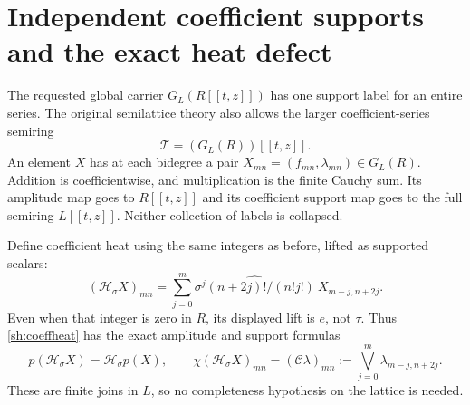 \documentclass[11pt]{article}
\newcommand{\Ht}{\mathcal H}
\begin{document}
\section{Independent coefficient supports and the exact heat defect}

The requested global carrier $G_L(R[[t,z]])$ has one support
label for an entire series. The original semilattice theory also
allows the larger coefficient-series semiring
\[
 \mathscr T=(G_L(R))[[t,z]].
\]
An element $X$ has at each bidegree a pair
$X_{mn}=(f_{mn},\lambda_{mn})\in G_L(R)$.
Addition is coefficientwise, and multiplication is the finite
Cauchy sum. Its amplitude map goes to $R[[t,z]]$ and its
coefficient support map goes to the full semiring $L[[t,z]]$.
Neither collection of labels is collapsed.

Define coefficient heat using the same integers as before,
lifted as supported scalars:
\begin{equation}\tag{SH31}\label{sh:coeffheat}
 (\mathscr H_\sigma X)_{mn}
 =\sum_{j=0}^m
 \widehat{\sigma^j(n+2j)!/(n!j!)}\ X_{m-j,n+2j}.
\end{equation}
Even when that integer is zero in $R$, its displayed lift is
$e$, not $\tau$. Thus \eqref{sh:coeffheat} has the exact
amplitude and support formulas
\begin{equation}\tag{SH32}\label{sh:coeffformula}
 p(\mathscr H_\sigma X)=\Ht_\sigma p(X),\qquad
 \chi(\mathscr H_\sigma X)_{mn}
       =(\mathcal C\lambda)_{mn}
       :=\bigvee_{j=0}^m\lambda_{m-j,n+2j}.
\end{equation}
These are finite joins in $L$, so no completeness hypothesis
on the lattice is needed.
\end{document}

